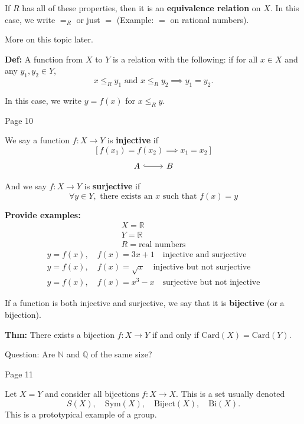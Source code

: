 \documentclass{article}
\begin{document}
If $R$ has all of these properties, then it is an \textbf{equivalence relation} on $X$. In this case, we write $= _R$ or just $=$ (Example: $=$ on rational numbers).

More on this topic later.

\textbf{Def:} A function from $X$ to $Y$ is a relation with the following: if for all $x \in X$ and any $y_1, y_2 \in Y$,
\[ x \leq_R y_1 \text{ and } x \leq_R y_2 \implies y_1 = y_2. \]

In this case, we write $y = f(x)$ for $x \leq_R y$.

\newpage
\begin{flushleft}
    Page 10
\end{flushleft}


We say a function $f: X \to Y$ is \textbf{injective} if 
\[ \left[ f(x_1) = f(x_2) \implies x_1 = x_2 \right] \]
\[
    \begin{tikzcd}
        A \arrow[r, hook] & B
        \end{tikzcd}
\]

And we say $f: X \to Y$ is \textbf{surjective} if 
\[ \forall y \in Y, \text{ there exists an } x \text{ such that } f(x) = y \]


\textbf{Provide examples:} 
\[
\begin{array}{l}
X = \mathbb{R} \\
Y = \mathbb{R} \\
R = \text{real numbers}
\end{array}
\]
\[ 
\begin{array}{l}
y = f(x), \quad f(x) = 3x + 1 \quad \text{injective and surjective} \\
y = f(x), \quad f(x) = \sqrt{x} \quad \text{injective but not surjective} \\
y = f(x), \quad f(x) = x^3 - x \quad \text{surjective but not injective}
\end{array}
\]

If a function is both injective and surjective, we say that it is \textbf{bijective} (or a bijection).



\textbf{Thm:} There exists a bijection $f: X \to Y$ if and only if $\text{Card}(X) = \text{Card}(Y)$. 

Question: Are $\mathbb{N}$ and $\mathbb{Q}$ of the same size?


\newpage
\begin{flushleft}
    Page 11
\end{flushleft}
Let $X = Y$ and consider all bijections $f: X \to X$.
This is a set usually denoted
\[
S(X), \quad \text{Sym}(X), \quad \text{Biject}(X), \quad \text{Bi}(X).
\]
This is a prototypical example of a group.
\end{document}

